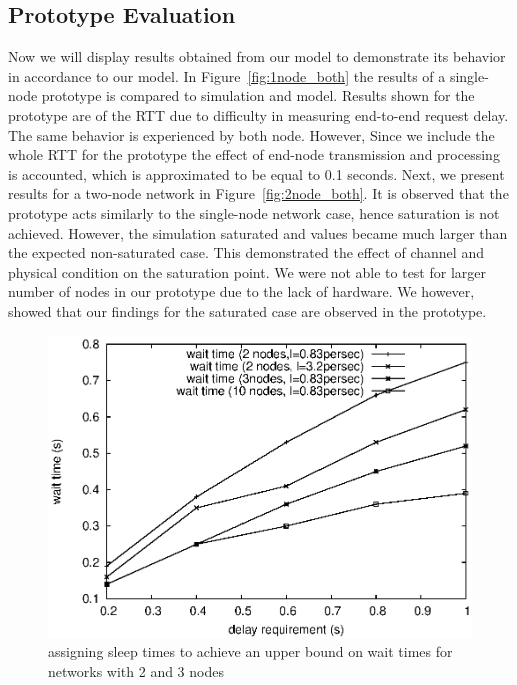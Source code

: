 \subsection{Prototype Evaluation}
Now we will display results obtained from our model to demonstrate its behavior in accordance to our model. In Figure~\ref{fig:1node_both} the results of a single-node prototype is compared to simulation and model. Results shown for the prototype are of the RTT due to difficulty in measuring end-to-end request delay. The same behavior is experienced by both node. However, Since we include the whole RTT for the prototype the effect of end-node transmission and processing is accounted, which is approximated to be equal to 0.1 seconds. Next, we present results for a two-node network in Figure~\ref{fig:2node_both}. It is observed that the prototype acts similarly to the single-node network case, hence saturation is not achieved. However, the simulation saturated and values became much larger than the expected non-saturated case. This demonstrated the effect of channel and physical condition on the saturation point. We were not able to test for larger number of nodes in our prototype due to the lack of hardware. We however, showed that our findings for the saturated case are observed in the prototype.

\begin{figure}[t]
\centering
\includegraphics[scale=0.65]{figures/test_2nodes.eps}
\caption{assigning sleep times to achieve an upper bound on wait times for networks with 2 and 3 nodes}
\label{fig:test_2nodes}
\end{figure}

